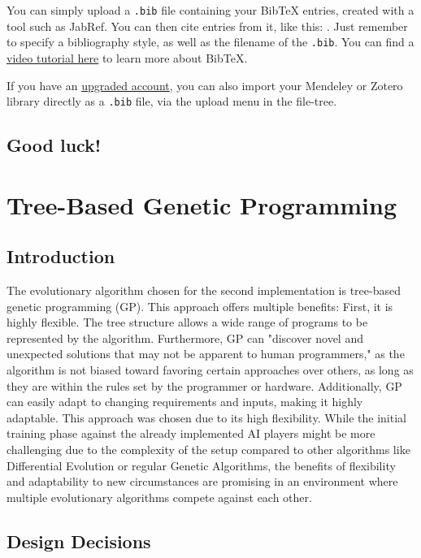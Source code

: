 \documentclass[sigconf]{acmart} %
\begin{document}
You can simply upload a \verb|.bib| file containing your BibTeX entries, created with a tool such as JabRef. You can then cite entries from it, like this: \cite{greenwade93}. Just remember to specify a bibliography style, as well as the filename of the \verb|.bib|. You can find a \href{https://www.overleaf.com/help/97-how-to-include-a-bibliography-using-bibtex}{video tutorial here} to learn more about BibTeX.

If you have an \href{https://www.overleaf.com/user/subscription/plans}{upgraded account}, you can also import your Mendeley or Zotero library directly as a \verb|.bib| file, via the upload menu in the file-tree.

\subsection{Good luck!}

\section{Tree-Based Genetic Programming}
\subsection{Introduction}
 
The evolutionary algorithm chosen for the second implementation is tree-based genetic programming (GP). This approach offers multiple benefits: 
First, it is highly flexible. The tree structure allows a wide range of programs to be represented by the algorithm. 
Furthermore, GP can "discover novel and unexpected solutions that may not be apparent to human programmers," as the algorithm is not biased toward favoring certain approaches over others, as long as they are within the rules set by the programmer or hardware. 
Additionally, GP can easily adapt to changing requirements and inputs, making it highly adaptable. 
This approach was chosen due to its high flexibility. While the initial training phase against the already implemented AI players might be more challenging due to the complexity of the setup compared to other algorithms like Differential Evolution or regular Genetic Algorithms, the benefits of flexibility and adaptability to new circumstances are promising in an environment where multiple evolutionary algorithms compete against each other. 

\subsection{Design Decisions}
\end{document}
